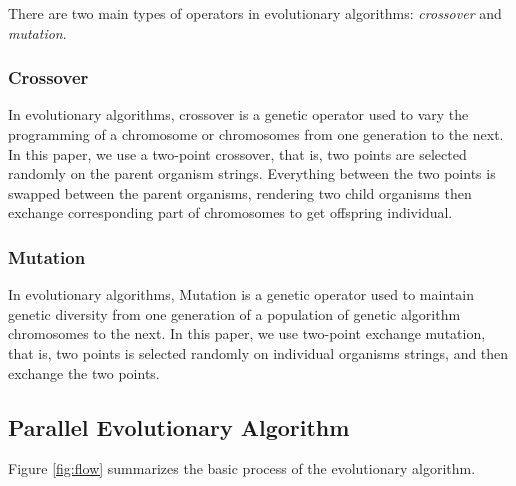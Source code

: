 There are two main types of operators in evolutionary algorithms:
\emph{crossover} and \emph{mutation}.

\subsubsection{Crossover}
In evolutionary algorithms, crossover is a genetic operator used to vary the
programming of a chromosome or chromosomes from one generation to the next.  In
this paper, we use a two-point crossover, that is, two points are selected
randomly on the parent organism strings. Everything between the two points is
swapped between the parent organisms, rendering two child organisms then
exchange corresponding part of chromosomes to get offspring individual.


\subsubsection{Mutation}
In evolutionary algorithms, Mutation is a genetic operator used to maintain
genetic diversity from one generation of a population of genetic algorithm
chromosomes to the next.  In this paper, we use two-point exchange mutation,
that is, two points is selected randomly on individual organisms strings, and
then exchange the two points.


\subsection{Parallel Evolutionary Algorithm}
%
Figure \ref{fig:flow} summarizes the basic process of the evolutionary
algorithm.


